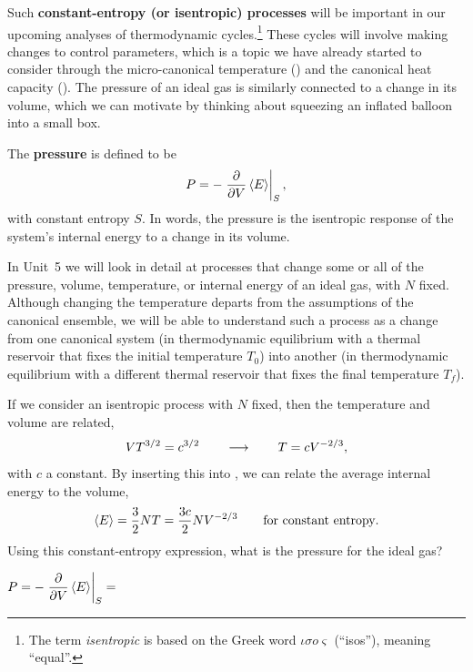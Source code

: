 Such \textbf{constant-entropy (or isentropic) processes} will be important in our upcoming analyses of thermodynamic cycles.\footnote{The term \emph{isentropic} is based on the Greek word $\iota\sigma o\varsigma$ (``isos''), meaning ``equal''.}
These cycles will involve making changes to control parameters, which is a topic we have already started to consider through the micro-canonical temperature () and the canonical heat capacity ().
The pressure of an ideal gas is similarly connected to a change in its volume, which we can motivate by thinking about squeezing an inflated balloon into a small box.

\begin{shaded}
  The \textbf{pressure} is defined to be
  \begin{equation}
    \label{eq:pressure}
    P = -\left. \frac{\partial }{\partial V} \left\langle E \right\rangle\right|_S,
  \end{equation}
  with constant entropy $S$.
  In words, the pressure is the isentropic response of the system's internal energy to a change in its volume.
\end{shaded}

In Unit~5 we will look in detail at processes that change some or all of the pressure, volume, temperature, or internal energy of an ideal gas, with $N$ fixed.
Although changing the temperature departs from the assumptions of the canonical ensemble, we will be able to understand such a process as a change from one canonical system (in thermodynamic equilibrium with a thermal reservoir that fixes the initial temperature $T_0$) into another (in thermodynamic equilibrium with a different thermal reservoir that fixes the final temperature $T_f$).

If we consider an isentropic process with $N$ fixed, then the temperature and volume are related,
\begin{equation*}
  V T^{3/2} = c^{3/2} \qquad \longrightarrow \qquad T = c V^{-2 / 3},
\end{equation*}
with $c$ a constant.
By inserting this into , we can relate the average internal energy to the volume,
\begin{equation*}
  \left\langle E \right\rangle = \frac{3}{2} NT = \frac{3c}{2} N V^{-2 / 3} \qquad \mbox{for constant entropy}.
\end{equation*}
Using this constant-entropy expression, what is the pressure for the ideal gas?
\begin{mdframed}
  $\displaystyle P = -\left. \frac{\partial }{\partial V} \left\langle E \right\rangle\right|_S = $ \\[100 pt]
\end{mdframed}

